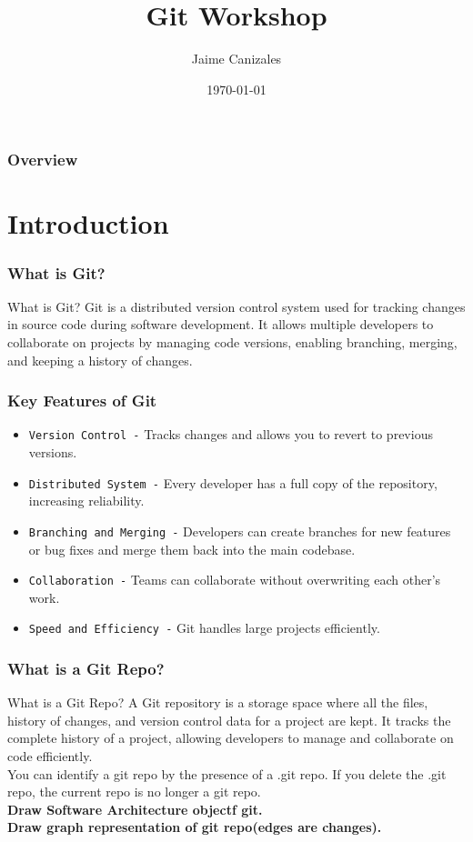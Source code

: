 \documentclass{beamer}
\title[Git Workshop]{Git Workshop}
\author{Jaime Canizales}
\institute[Hunter College] 
{
City University of New York \\ 
\medskip
\textit{jaime.canizales@hunter.cuny.edu} 
}
\date{\today}
\begin{document}
\begin{frame}
\titlepage 
\end{frame}


\begin{frame} \frametitle{Overview} 
\tableofcontents
\end{frame}


\section{Introduction}
\begin{frame}\frametitle{What is Git?}
\begin{block}{What is Git?}
Git is a distributed version control system used for tracking changes in source
code during software development. It allows multiple developers to collaborate
on projects by managing code versions, enabling branching, merging, and keeping
a history of changes. 
\end{block}
\end{frame}


\begin{frame}\frametitle{Key Features of Git}
\begin{itemize}
\item  \texttt{Version Control -} Tracks changes and allows you to revert to previous versions.
\item  \texttt{Distributed System -} Every developer has a full copy of the repository, increasing reliability.
\item  \texttt{Branching and Merging -} Developers can create branches for new features or bug fixes and merge them back into the main codebase.
\item  \texttt{Collaboration -} Teams can collaborate without overwriting each other's work.
\item  \texttt{Speed and Efficiency -} Git handles large projects efficiently. 
\end{itemize}
\end{frame}
    

\begin{frame}\frametitle{What is a Git Repo?}
\begin{block}{What is a Git Repo?}
A Git repository is a storage space where all the files, history of changes, 
and version control data for a project are kept. It tracks the complete history
of a project, allowing developers to manage and collaborate on code efficiently.\\
You can identify a git repo by the presence of a .git repo. If you delete the
.git repo, the current repo is no longer a git repo.\\
\textbf{Draw Software Architecture objectf git.}\\
\textbf{Draw graph representation of git repo(edges are changes).}\\
\end{block}
\end{frame}
\end{document}
